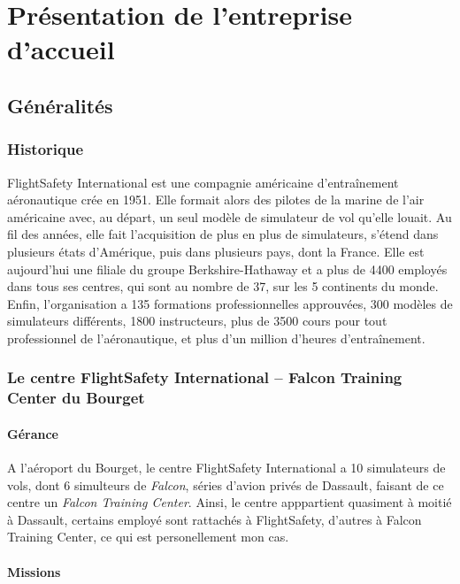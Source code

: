 \documentclass[a4paper,french,11pt,openany,oneside]{memoir}
\begin{document}
\part{Présentation de l'entreprise d'accueil}

\chapter{Généralités}

\section{Historique}

FlightSafety International est une compagnie américaine d'entraînement aéronautique crée en 1951. Elle formait alors des pilotes de la marine de l'air américaine avec, au départ, un seul modèle de simulateur de vol qu'elle louait. Au fil des années, elle fait l'acquisition de plus en plus de simulateurs, s'étend dans plusieurs états d'Amérique, puis dans plusieurs pays, dont la France. Elle est aujourd'hui une filiale du groupe Berkshire-Hathaway et a plus de 4400 employés dans tous ses centres, qui sont au nombre de 37, sur les 5 continents du monde. Enfin, l'organisation a 135 formations professionnelles approuvées, 300 modèles de simulateurs différents, 1800 instructeurs, plus de 3500 cours pour tout professionnel de l'aéronautique, et plus d'un million d'heures d'entraînement.


\section{Le centre FlightSafety International -- Falcon Training Center du Bourget}

\subsection{Gérance}

A l'aéroport du Bourget, le centre FlightSafety International a 10 simulateurs de vols, dont 6 simulteurs de \emph{Falcon}, séries d'avion privés de Dassault, faisant de ce centre un \emph{Falcon Training Center}. Ainsi, le centre apppartient quasiment à moitié à Dassault, certains employé sont rattachés à FlightSafety, d'autres à Falcon Training Center, ce qui est personellement mon cas.

\subsection{Missions}
\end{document}
